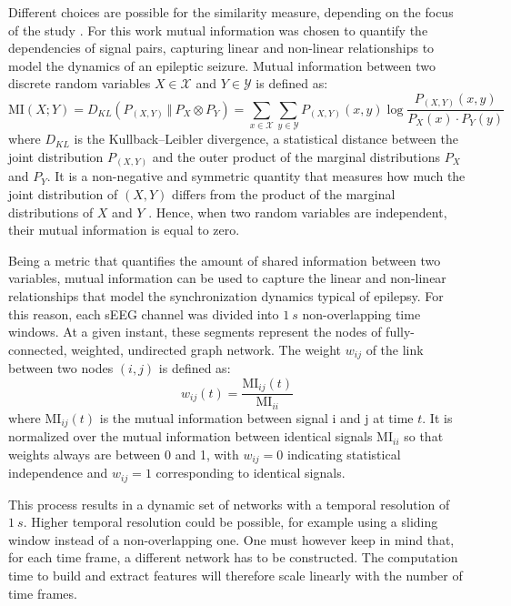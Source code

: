 Different choices are possible for the similarity measure, depending on the
focus of the study \cite{eeg-book}.
For this work mutual information was chosen to quantify the dependencies of
signal pairs, capturing linear and non-linear relationships to model the
dynamics of an epileptic seizure. Mutual information between two discrete
random variables $X\in\mathcal{X}$ and $Y\in\mathcal{Y}$ is defined as:
\begin{equation}
    \text{MI}(X;Y) = D_{KL}(P_{(X,Y)}\ \Vert\ P_X \otimes P_Y)
    = \sum_{x\in\mathcal{X}}\sum_{y\in\mathcal{Y}}
    {P_{(X,Y)}(x,y)\log{\frac{P_{(X,Y)}(x,y)}{P_{X}(x)\cdot P_{Y}(y)}}}
\end{equation}
where $D_{KL}$ is the Kullback–Leibler divergence, a statistical distance
between the joint distribution $P_{(X,Y)}$ and the outer product of the
marginal distributions $P_X$ and $P_Y$. 
It is a non-negative and symmetric quantity that measures how much the joint
distribution of $(X,Y)$ differs from the product of the marginal distributions
of $X$ and $Y$ \cite{cover1991elements}. Hence, when two random variables
are independent, their mutual information is equal to zero.

Being a metric that quantifies the amount of shared information between two
variables, mutual information can be used to capture the linear and non-linear
relationships that model the synchronization dynamics typical of epilepsy.
For this reason, each sEEG channel was divided into $1\ s$ 
non-overlapping time windows.
At a given instant, these segments represent the nodes of fully-connected,
weighted, undirected graph network.
The weight $w_{ij}$ of the link between two nodes $(i,j)$ is defined as:
\begin{equation}
    w_{ij}(t) = \frac{\text{MI}_{ij}(t)}{\text{MI}_{ii}}
\end{equation}
where $\text{MI}_{ij}(t)$ is the mutual information between signal i and j at time $t$.
It is normalized over the mutual information between identical signals $\text{MI}_{ii}$
so that weights always are between 0 and 1,
with $w_{ij} = 0$ indicating statistical
independence and $w_{ij} = 1$ corresponding to identical signals.

This process results in a dynamic set of networks with a temporal resolution of
$1\ s$. Higher temporal resolution could be possible, for example using a
sliding window instead of a non-overlapping one.
One must however keep in mind that, for each time frame, a different network has
to be constructed. The computation time to build and extract features will
therefore scale linearly with the number of time frames.


